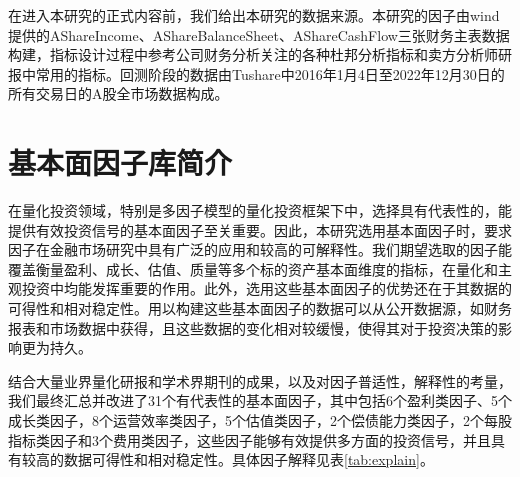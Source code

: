 \documentclass[11pt]{article}
\begin{document}
在进入本研究的正式内容前，我们给出本研究的数据来源。本研究的因子由wind提供的AShareIncome、AShareBalanceSheet、AShareCashFlow三张财务主表数据构建，指标设计过程中参考公司财务分析关注的各种杜邦分析指标和卖方分析师研报中常用的指标。回测阶段的数据由Tushare中2016年1月4日至2022年12月30日的所有交易日的A股全市场数据构成。
\section{基本面因子库简介}

在量化投资领域，特别是多因子模型的量化投资框架下中，选择具有代表性的，能提供有效投资信号的基本面因子至关重要。因此，本研究选用基本面因子时，要求因子在金融市场研究中具有广泛的应用和较高的可解释性。我们期望选取的因子能覆盖衡量盈利、成长、估值、质量等多个标的资产基本面维度的指标，在量化和主观投资中均能发挥重要的作用。此外，选用这些基本面因子的优势还在于其数据的可得性和相对稳定性。用以构建这些基本面因子的数据可以从公开数据源，如财务报表和市场数据中获得，且这些数据的变化相对较缓慢，使得其对于投资决策的影响更为持久。

结合大量业界量化研报和学术界期刊的成果，以及对因子普适性，解释性的考量，我们最终汇总并改进了31个有代表性的基本面因子，其中包括6个盈利类因子、5个成长类因子，8个运营效率类因子，5个估值类因子，2个偿债能力类因子，2个每股指标类因子和3个费用类因子，这些因子能够有效提供多方面的投资信号，并且具有较高的数据可得性和相对稳定性。具体因子解释见表\ref{tab:explain}。
\end{document}
